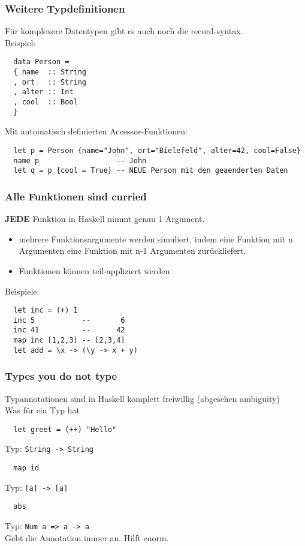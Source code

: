 \documentclass{beamer}
\begin{document}
\begin{frame}[fragile]
 \frametitle{Weitere Typdefinitionen}
 Für komplexere Datentypen gibt es auch noch die record-syntax.\\\vspace*{0.5cm}
 \pause
 Beispiel:
 \pause
 \begin{lstlisting}
  data Person = 
  { name  :: String
  , ort   :: String
  , alter :: Int
  , cool  :: Bool
  }
 \end{lstlisting}
 \pause
 Mit automatisch definierten Accessor-Funktionen:
 \begin{lstlisting}
  let p = Person {name="John", ort="Bielefeld", alter=42, cool=False}
  name p                  -- John
  let q = p {cool = True} -- NEUE Person mit den geaenderten Daten
 \end{lstlisting}
\end{frame}

\begin{frame}[fragile]
 \frametitle{Alle Funktionen sind curried}
 \textbf{JEDE} Funktion in Haskell nimmt genau 1 Argument.\\\vspace*{0.5cm}
 \pause
 \begin{itemize}
  \item mehrere Funktionsargumente werden simuliert, indem eine Funktion mit n Argumenten eine Funktion mit n-1 Argumenten zurückliefert.
  \pause
  \item Funktionen können teil-appliziert werden
 \end{itemize}
 \pause
 Beispiele:
 \pause
 \begin{lstlisting}
  let inc = (+) 1
  inc 5           --       6
  inc 41          --      42
  map inc [1,2,3] -- [2,3,4]
  let add = \x -> (\y -> x + y)
 \end{lstlisting}
\end{frame}

\begin{frame}[fragile]
 \frametitle{Types you do not type}
 Typannotationen sind in Haskell komplett freiwillig (abgesehen ambiguity)\\\vspace*{0.5cm}
 \pause
 Was für ein Typ hat
 \begin{lstlisting}
  let greet = (++) "Hello"
 \end{lstlisting}
 \pause
 Typ: \texttt{String -> String}
 \pause
 \begin{lstlisting}
  map id
 \end{lstlisting}
 \pause
 Typ: \texttt{[a] -> [a]}
 \pause
 \begin{lstlisting}
  abs
 \end{lstlisting}
 \pause
 Typ: \texttt{Num a => a -> a}\\
 \pause
 Gebt die Annotation immer an. Hilft enorm.
\end{frame}
\end{document}
